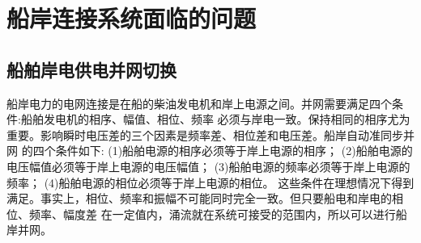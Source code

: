 
\begin{table}[!htp]
	\centering
	\caption[船用岸电供电方式比较]{船用岸电供电方式比较}
	\label{tab:船用岸电供电方式比较}
\end{table}

\section{船岸连接系统面临的问题}
\subsection{船舶岸电供电并网切换}
船岸电力的电网连接是在船的柴油发电机和岸上电源之间。并网需要满足四个条件:船舶发电机的相序、幅值、相位、频率
必须与岸电一致。保持相同的相序尤为重要。影响瞬时电压差的三个因素是频率差、相位差和电压差。船岸自动准同步并网
的四个条件如下:
(1)船舶电源的相序必须等于岸上电源的相序；
(2)船舶电源的电压幅值必须等于岸上电源的电压幅值；
(3)船舶电源的频率必须等于岸上电源的频率；
(4)船舶电源的相位必须等于岸上电源的相位。
这些条件在理想情况下得到满足。事实上，相位、频率和振幅不可能同时完全一致。但只要船电和岸电的相位、频率、幅度差
在一定值内，涌流就在系统可接受的范围内，所以可以进行船岸并网。


